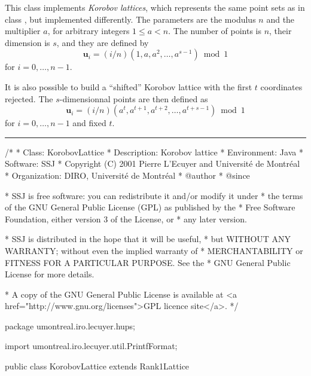 
This class implements \emph{Korobov lattices}, which represents the same point
sets as in class , but implemented differently.
The parameters are the modulus $n$ and the multiplier $a$, for arbitrary
integers $1 \le a < n$.
The number of points is $n$, their dimension is 
$s$, and they are defined by
\[
  \mathbf{u}_i = (i/n)(1, a, a^2, \ldots, a^{s-1}) \bmod 1
\]
for $i=0,\dots,n-1$.

It is also possible to build a ``shifted'' Korobov lattice with the first
$t$ coordinates rejected. The $s$-dimensionnal points are then defined as
$$
  \mathbf{u}_i = (i/n)(a^{t}, a^{t+1}, a^{t+2}, \ldots, a^{t+s-1}) \bmod 1
$$
for $i=0,\dots,n-1$ and fixed $t$.

\bigskip\hrule\bigskip

\begin{code}
\begin{hide}
/*
 * Class:        KorobovLattice
 * Description:  Korobov lattice
 * Environment:  Java
 * Software:     SSJ 
 * Copyright (C) 2001  Pierre L'Ecuyer and Université de Montréal
 * Organization: DIRO, Université de Montréal
 * @author       
 * @since

 * SSJ is free software: you can redistribute it and/or modify it under
 * the terms of the GNU General Public License (GPL) as published by the
 * Free Software Foundation, either version 3 of the License, or
 * any later version.

 * SSJ is distributed in the hope that it will be useful,
 * but WITHOUT ANY WARRANTY; without even the implied warranty of
 * MERCHANTABILITY or FITNESS FOR A PARTICULAR PURPOSE.  See the
 * GNU General Public License for more details.

 * A copy of the GNU General Public License is available at
   <a href="http://www.gnu.org/licenses">GPL licence site</a>.
 */
\end{hide}
package umontreal.iro.lecuyer.hups;
\begin{hide}
import umontreal.iro.lecuyer.util.PrintfFormat;
\end{hide}

public class KorobovLattice extends Rank1Lattice \begin{hide} {
   protected int genA;                        // Multiplier a.

   // Method modPower is inherited from Rank1Lattice.
\end{hide}
\end{code}

